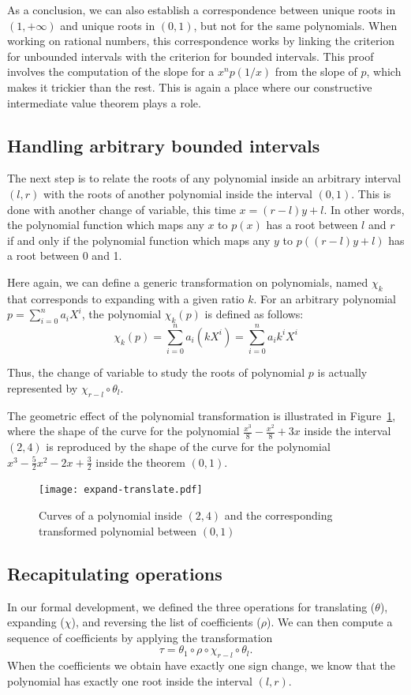 \documentclass{mscs}
\begin{document}
As a conclusion, we can also establish a correspondence between unique
roots in \((1,+\infty)\) and unique roots in \((0,1)\), but not for the
same polynomials.  When working on rational numbers, this
correspondence works by linking the criterion for unbounded intervals
with the criterion for bounded intervals.  This proof involves the
computation of the slope for a \(x^np(1/x)\) from the slope of \(p\),
which makes it trickier than the rest.  This is again a place where
our constructive intermediate value theorem plays a role.

\subsection{Handling arbitrary bounded intervals}

The next step is to relate the roots of any polynomial inside an
arbitrary interval \((l,r)\) with the roots of another
polynomial inside the interval \((0,1)\).  This is done with another
change of variable, this time \(x= (r-l) y + l\). In other words, the
polynomial function which maps any \(x\) to \(p(x)\) has a root
between \(l\) and \(r\) if and only if the polynomial function which
maps any \(y\) to \(p((r - l) y + l)\) has a root between 0 and 1.

Here again, we can define a generic transformation on polynomials,
named \(\chi_k\) that corresponds to expanding with a given ratio $k$.
For an arbitrary polynomial \(p=\sum_{i=0}^n a_i X^i\), the polynomial
\(\chi_k(p)\) is defined as follows:
\[\chi_k(p) = \sum_{i=0}^n a_i(kX^i) = \sum_{i=0}^n a_ik^i X^i\]

Thus, the change of variable to study the roots of polynomial \(p\)
is actually represented by \(\chi_{r-l}\circ \theta_l\).

The geometric effect of the polynomial transformation
is illustrated in Figure~\ref{expand-translate}, where the shape
of the curve for the polynomial \(\frac{x^3}{8} - \frac{x^2}{8} + 3
x\) inside the interval \((2,4)\) is reproduced by the shape of the
curve for the polynomial \(x^3 -\frac{5}{2}x^2-2x+\frac{3}{2}\) inside
the theorem \((0,1)\).
\begin{figure}
\begin{center}
\texttt{[image: expand-translate.pdf]}
\end{center}
\caption{\label{expand-translate} 
Curves of a polynomial inside \((2,4)\) and the
  corresponding transformed polynomial between \((0,1)\)}
\end{figure}
\subsection{Recapitulating operations}\label{ssec:ops}
In our formal development, we defined the three operations for
translating (\(\theta\)), expanding (\(\chi\)),
 and reversing the list of coefficients (\(\rho\)).  We can then
compute a sequence of coefficients by applying the transformation
\[\tau = \theta_1\circ\rho\circ \chi_{r-l}\circ \theta_{l}.\]
When the coefficients we obtain have exactly one sign change, we
know that the polynomial has exactly one root inside the interval
\((l,r)\).
\end{document}
